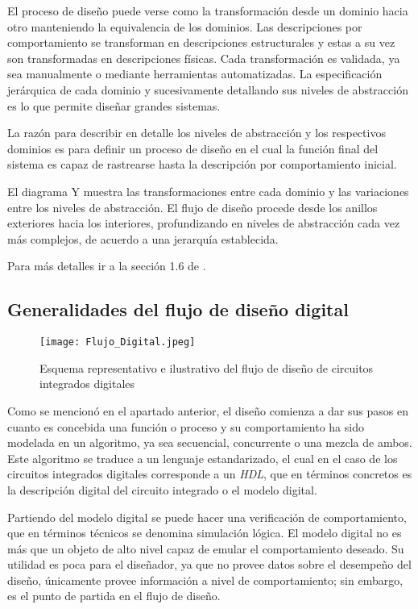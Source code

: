 El proceso de diseño puede verse como la transformación desde un dominio hacia otro manteniendo la equivalencia de los dominios. Las descripciones por comportamiento se transforman en descripciones estructurales y estas a su vez son transformadas en descripciones físicas. Cada transformación es validada, ya sea manualmente o mediante herramientas automatizadas. La especificación jerárquica de cada dominio y sucesivamente detallando sus niveles de abstracción es lo que permite diseñar grandes sistemas. 

La razón para describir en detalle los niveles de abstracción y los respectivos dominios es para definir un proceso de diseño en el cual la función final del sistema es capaz de rastrearse hasta la descripción por comportamiento inicial.

El diagrama Y muestra las transformaciones entre cada dominio y las variaciones entre los niveles de abstracción. El flujo de diseño procede desde los anillos exteriores hacia los interiores, profundizando en niveles de abstracción cada vez más complejos, de acuerdo a una jerarquía establecida.

Para más detalles ir a la sección 1.6 de \cite{book:weste2005}.

\subsection{Generalidades del flujo de diseño digital}
\label{sec:gen_d_flow}
\begin{figure}[t]
\texttt{[image: Flujo\_Digital.jpeg]}
\centering
\caption{Esquema representativo e ilustrativo del flujo de diseño de circuitos integrados digitales}
\label{Dflow1}
\end{figure}

Como se mencionó en el apartado anterior, el diseño comienza a dar sus pasos en cuanto es concebida una función o proceso y su comportamiento ha sido modelada en un algoritmo, ya sea secuencial, concurrente o una mezcla de ambos. Este algoritmo se traduce a un lenguaje estandarizado, el cual en el caso de los circuitos integrados digitales corresponde a un \textit{HDL}, que en términos concretos es la descripción digital del circuito integrado o el modelo digital.

Partiendo del modelo digital se puede hacer una verificación de comportamiento, que en términos técnicos se denomina simulación lógica. El modelo digital no es más que un objeto de alto nivel capaz de emular el comportamiento deseado. Su utilidad es poca para el diseñador, ya que no provee datos sobre el desempeño del diseño, únicamente provee 
información a nivel de comportamiento; sin embargo, es el punto de partida en el flujo de diseño.

